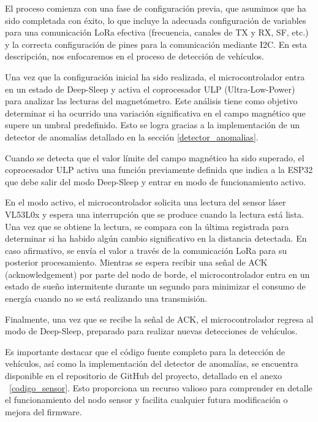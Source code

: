 





El proceso comienza con una fase de configuración previa, que asumimos que ha sido completada con éxito, lo que incluye la adecuada configuración de variables para una comunicación LoRa efectiva (frecuencia, canales de TX y RX, SF, etc.) y la correcta configuración de pines para la comunicación mediante I2C. En esta descripción, nos enfocaremos en el proceso de detección de vehículos.


Una vez que la configuración inicial ha sido realizada, el microcontrolador entra en un estado de Deep-Sleep y activa el coprocesador ULP (Ultra-Low-Power) para analizar las lecturas del magnetómetro. Este análisis tiene como objetivo determinar si ha ocurrido una variación significativa en el campo magnético que supere un umbral predefinido. Esto se logra gracias a la implementación de un detector de anomalías detallado en la sección \ref{detector_anomalias}.




Cuando se detecta que el valor límite del campo magnético ha sido superado, el coprocesador ULP activa una función previamente definida que indica a la ESP32 que debe salir del modo Deep-Sleep y entrar en modo de funcionamiento activo.

En el modo activo, el microcontrolador solicita una lectura del sensor láser VL53L0x y espera una interrupción que se produce cuando la lectura está lista. Una vez que se obtiene la lectura, se compara con la última registrada para determinar si ha habido algún cambio significativo en la distancia detectada. En caso afirmativo, se envía el valor a través de la comunicación LoRa para su posterior procesamiento. Mientras se espera recibir una señal de ACK (acknowledgement) por parte del nodo de borde, el microcontrolador entra en un estado de sueño intermitente durante un segundo para minimizar el consumo de energía cuando no se está realizando una transmisión.

Finalmente, una vez que se recibe la señal de ACK, el microcontrolador regresa al modo de Deep-Sleep, preparado para realizar nuevas detecciones de vehículos.

Es importante destacar que el código fuente completo para la detección de vehículos, así como la implementación del detector de anomalías, se encuentra disponible en el repositorio de GitHub del proyecto, detallado en el anexo ~\ref{codigo_sensor}. Esto proporciona un recurso valioso para comprender en detalle el funcionamiento del nodo sensor y facilita cualquier futura modificación o mejora del firmware.

